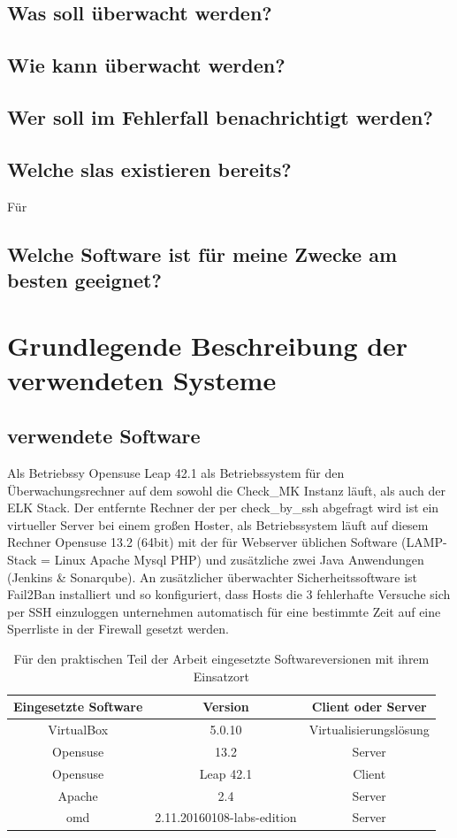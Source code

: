 \documentclass[12pt,a4paper,parskip,listof=totoc,bibliography=totoc]{scrreprt}
\begin{document}
	\subsection{Was soll überwacht werden?}
	\subsection{Wie kann überwacht werden?}
	\subsection{Wer soll im Fehlerfall benachrichtigt werden?}
	\subsection{Welche \acrlong{sla}s existieren bereits?}
	Für 
	\subsection{Welche Software ist für meine Zwecke am besten geeignet?}
	\section{Grundlegende Beschreibung der verwendeten Systeme}
	\subsection{verwendete Software}
	Als Betriebssy
	Opensuse Leap 42.1 als Betriebssystem für den Überwachungsrechner auf dem sowohl die Check\_MK Instanz läuft, als auch der ELK Stack. Der entfernte Rechner der per check\_by\_ssh abgefragt wird ist ein virtueller Server bei einem großen Hoster, als Betriebssystem läuft auf diesem Rechner Opensuse 13.2 (64bit) mit der für Webserver üblichen Software (LAMP-Stack = Linux Apache Mysql PHP) und zusätzliche zwei Java Anwendungen (Jenkins \& Sonarqube). An zusätzlicher überwachter Sicherheitssoftware ist Fail2Ban installiert und so konfiguriert, dass Hosts die 3 fehlerhafte Versuche sich per SSH einzuloggen unternehmen automatisch für eine bestimmte Zeit auf eine Sperrliste in der Firewall gesetzt werden. \\
	\begin{table}[h] %
	\begin{center}
	\begin{tabular}{|c|c|c|}
	\hline 
	Eingesetzte Software & Version & Client oder Server \\ 
	\hline 
	VirtualBox & 5.0.10 & Virtualisierungslösung\\
	\hline
	Opensuse & 13.2 & Server\\ 
	\hline 
	Opensuse & Leap 42.1 & Client\\
	\hline
	Apache & 2.4 & Server\\
	\hline
	\acrshort{omd} & 2.11.20160108-labs-edition & Server\\
	\hline
	\end{tabular} 
	\caption[Eingesetzte Softwareversionen]{Für den praktischen Teil der Arbeit eingesetzte Softwareversionen mit ihrem Einsatzort}
	\end{center}
	\end{table}
\end{document}
